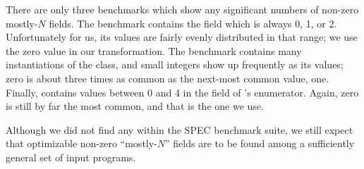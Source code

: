 \documentclass[preprint]{acmconf}
\begin{document}
There are only three benchmarks which show any significant numbers of
non-zero mostly-$N$ fields.  The  benchmark contains
the field  which is always 0, 1, or 2.  Unfortunately
for us, its values are fairly evenly distributed in that range; we use
the zero value in our transformation.  The  benchmark
contains many instantiations of the  class,
and small integers show up frequently as its values; zero is about
three times as common as the next-most common value, one.  Finally,
 contains values between 0 and 4 in the
 field of 's
enumerator.  Again, zero is still by far the most common, and that is
the one we use.

Although we did not find any within the SPEC benchmark suite, we still
expect that optimizable non-zero ``mostly-$N$'' fields are to be found
among a sufficiently general set of input programs.
\end{document}

